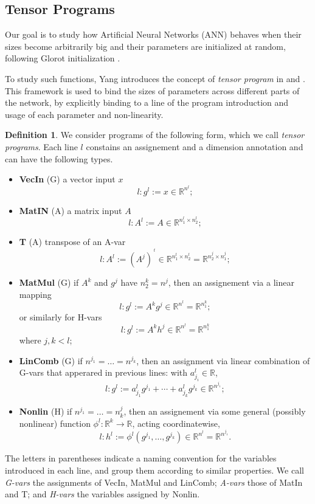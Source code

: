 \documentclass[11pt,notitlepage]{article}
\numberwithin{equation}{section}
\def\R{{\mathbb{R}}}
\def\tr{{\,\!^t}}
\theoremstyle{remark}
\theoremstyle{definition}
\newtheorem{definition_body}[theorem]{Definition}
\newcommand{\definition}[1]{
	\theoremstyle{definition}
	\begin{definition_body}
		#1
	\end{definition_body}
	\theoremstyle{plain}
}
\begin{document}
	\subsection{Tensor Programs}\label{subsec:tensorProg}
	
	Our goal is to study how Artificial Neural Networks (ANN) behaves when their sizes become arbitrarily big and their parameters are initialized at random, following Glorot initialization \cite{glorot2010understanding}.
	
	To study such functions, Yang introduces the concept of \emph{tensor program} in \cite{yang2019scaling} and \cite{yang2019tensor}.
	This framework is used to bind the sizes of parameters across different parts of the network, by explicitly binding to a line of the program introduction and usage of each parameter and non-linearity.
	
	\definition{
		We consider programs of the following form, which we call \emph{tensor programs}. Each line $l$ constains an assignement and a dimension annotation  and can have the following types.
		\begin{itemize}
			\item \textbf{VecIn} (G) a vector input $x$
			\[l: g^l := x \in \R^{n^l}; \]
			\item \textbf{MatIN} (A) a matrix input $A$
			 \[l: A^l := A \in\R^{n^l_1 \times n^l_2}; \]
			\item \textbf{T} (A) transpose of an A-var
			 \[l: A^l := (A^j)^\tr \in \R^{n^l_1 \times n^l_2} = \R^{n^j_2 \times n^j_1}; \]
			\item \textbf{MatMul} (G) if $A^k$ and $g^j$ have $n^k_2 = n^j$, then an assignement via a linear mapping
			\[l: g^l := A^kg^j \in \R^{n^l} = \R^{n_1^k}; \]
			 or similarly for H-vars
			 \[l: g^l := A^kh^j \in \R^{n^l} = \R^{n^k_1} \] where $j,k < l$;
			\item \textbf{LinComb} (G) if $n^{j_1} = \dots = n^{j_k}$, then an assignment via linear combination of G-vars that apperared in previous lines: with $a^l_{j_i} \in \R$,
			\[l: g^l := a^l_{j_1}g^{j_1} + \cdots + a^l_{j_k}g^{j_k} \in \R^{n^{j_1}}; \]
			\item \textbf{Nonlin} (H) if $n^{j_1} = \dots = n^j_k$, then an assignement via some general (possibly nonlinear) function $\phi^l : \R^k \rightarrow \R$, acting coordinatewise,
			\[l: h^l := \phi^l( g^{j_1}, \dots, g^{j_k}) \in \R^{n^l} = \R^{n^{j_1}}. \]
		\end{itemize}
	
	The letters in parentheses indicate a naming convention for the variables introduced in each line, and group them according to similar properties.
	We call \emph{G-vars} the assignments of VecIn, MatMul and LinComb; \emph{A-vars} those of MatIn and T; and \emph{H-vars} the variables assigned by Nonlin.
	
    }
\end{document}

